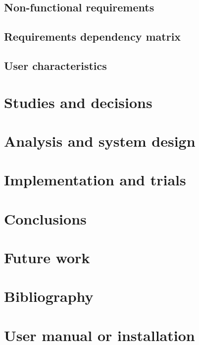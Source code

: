 \documentclass[a4paper, 12pt, oneside]{book}
\begin{document}
\section{Non-functional requirements}
\section{Requirements dependency matrix}
\section{User characteristics}
\chapter{Studies and decisions}
\chapter{Analysis and system design}
\chapter{Implementation and trials}
\chapter{Conclusions}
\chapter{Future work}
\appendix
\chapter{Bibliography}
\chapter{User manual or installation}
\end{document}
